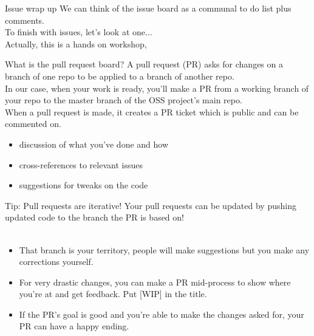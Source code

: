 \documentclass{beamer}
\begin{document}
\begin{frame}{Issue wrap up}
	We can think of the issue board as a communal to do list plus comments.\\[20pt]
	
	To finish with issues, let's look at one...\\[12pt]
	Actually, this is a hands on workshop, \\[8pt]
	
\end{frame}

\begin{frame}{What is the pull request board?}
	A pull request (PR) asks for changes on a branch of one repo to be applied to a branch of another repo.\\[10pt]
	In our case, when your work is ready, you'll make a PR from a working branch of your repo to the master branch of the OSS project's main repo.\\[10pt]
	When a pull request is made, it creates a PR ticket which is public and can be commented on.\\
	\begin{itemize}
		\item discussion of what you've done and how
		\item cross-references to relevant issues
		\item suggestions for tweaks on the code
	\end{itemize}

\end{frame}

\begin{frame}{Tip: Pull requests are iterative!}
	Your pull requests can be updated by pushing updated code to the branch the PR is based on!\\[12pt]
	\\
	\begin{itemize}
		\item That branch is your territory, people will make suggestions but you make any corrections yourself.
        \item For very drastic changes, you can make a PR mid-process to show where you're at and get feedback.  Put [WIP] in the title.
        \item If the PR's goal is good and you're able to make the changes asked for, your PR can have a happy ending.
	\end{itemize}

\end{frame}
\end{document}

